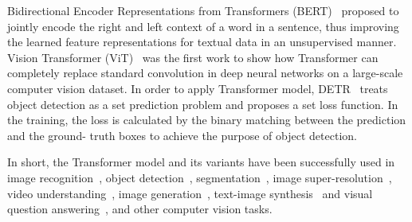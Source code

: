 Bidirectional Encoder Representations from Transformers (BERT)~\cite{devlin2018bert} proposed to jointly encode the right and left context of a word in a sentence, thus improving the learned feature representations for textual data in an unsupervised manner. Vision Transformer (ViT)~\cite{dosovitskiy2020image} was the first work to show how Transformer can completely replace standard convolution in deep neural networks on a large-scale computer vision dataset. In order to apply Transformer model, DETR~\cite{carion2020end} treats object detection as a set prediction problem and proposes a set loss function. In the training, the loss is calculated by the binary matching between the prediction and the ground- truth boxes to achieve the purpose of object detection.

In short, the Transformer model and its variants have been successfully used in image recognition~\cite{dosovitskiy2020image, touvron2021training}, object detection~\cite{carion2020end,zhu2020deformable}, segmentation~\cite{ye2019cross}, image super-resolution~\cite{yang2020learning}, video understanding~\cite{sun2019videobert}, image generation~\cite{chen2021pre}, text-image synthesis~\cite{ramesh2021dall} and visual question answering~\cite{tan2019lxmert}, and other computer vision tasks.
